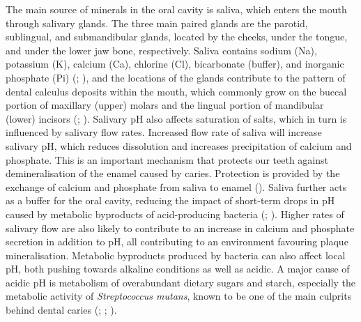 \documentclass[
  b5paper,
]{book}
\begin{document}
The main source of minerals in the oral cavity is saliva, which enters
the mouth through salivary glands. The three main paired glands are the
parotid, sublingual, and submandibular glands, located by the cheeks,
under the tongue, and under the lower jaw bone, respectively. Saliva
contains sodium (Na), potassium (K), calcium (Ca), chlorine (Cl),
bicarbonate (buffer), and inorganic phosphate (Pi)
(;
), and the
locations of the glands contribute to the pattern of dental calculus
deposits within the mouth, which commonly grow on the buccal portion of
maxillary (upper) molars and the lingual portion of mandibular (lower)
incisors (;
). Salivary pH also
affects saturation of salts, which in turn is influenced by salivary
flow rates. Increased flow rate of saliva will increase salivary pH,
which reduces dissolution and increases precipitation of calcium and
phosphate. This is an important mechanism that protects our teeth
against demineralisation of the enamel caused by caries. Protection is
provided by the exchange of calcium and phosphate from saliva to enamel
().
Saliva further acts as a buffer for the oral cavity, reducing the impact
of short-term drops in pH caused by metabolic byproducts of
acid-producing bacteria (; ). Higher rates of salivary flow are also likely to contribute to
an increase in calcium and phosphate secretion in addition to pH, all
contributing to an environment favouring plaque mineralisation.
Metabolic byproducts produced by bacteria can also affect local pH, both
pushing towards alkaline conditions as well as acidic. A major cause of
acidic pH is metabolism of overabundant dietary sugars and starch,
especially the metabolic activity of \emph{Streptococcus mutans}, known
to be one of the main culprits behind dental caries
(;
;
).
\end{document}
